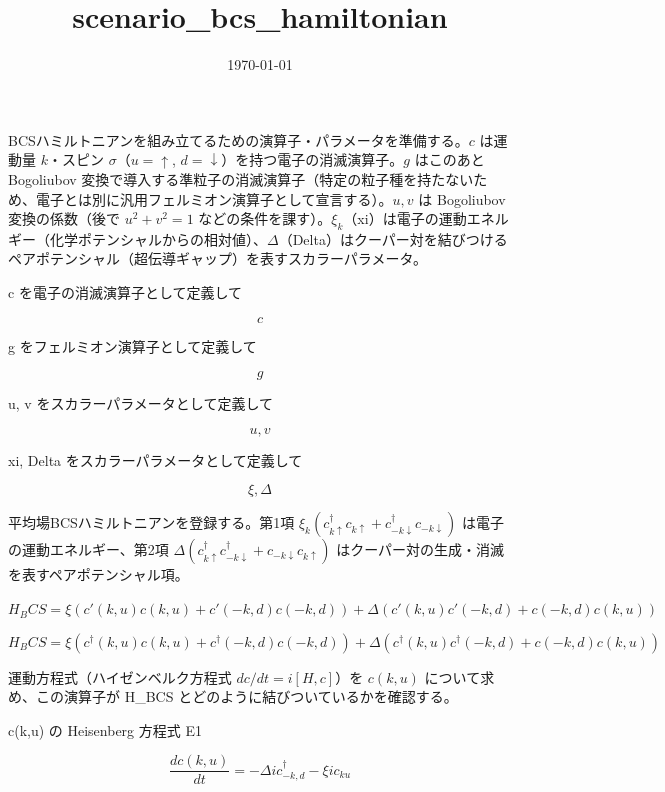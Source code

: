 \documentclass[dvipdfmx,a4paper,11pt]{jsarticle}
\title{scenario\_bcs\_hamiltonian}
\date{\today}
\begin{document}
\maketitle

BCSハミルトニアンを組み立てるための演算子・パラメータを準備する。$c$ は運動量 $k$・スピン $\sigma$（$u=\uparrow$, $d=\downarrow$）を持つ電子の消滅演算子。$g$ はこのあと Bogoliubov 変換で導入する準粒子の消滅演算子（特定の粒子種を持たないため、電子とは別に汎用フェルミオン演算子として宣言する）。$u, v$ は Bogoliubov 変換の係数（後で $u^2+v^2=1$ などの条件を課す）。$\xi_k$（xi）は電子の運動エネルギー（化学ポテンシャルからの相対値）、$\Delta$（Delta）はクーパー対を結びつけるペアポテンシャル（超伝導ギャップ）を表すスカラーパラメータ。

c を電子の消滅演算子として定義して

\[
  c
\]

g をフェルミオン演算子として定義して

\[
  g
\]

u, v をスカラーパラメータとして定義して

\[
  u, v
\]

xi, Delta をスカラーパラメータとして定義して

\[
  \xi, \Delta
\]

平均場BCSハミルトニアンを登録する。第1項 $\xi_k(c^\dagger_{k\uparrow}c_{k\uparrow}+c^\dagger_{-k\downarrow}c_{-k\downarrow})$ は電子の運動エネルギー、第2項 $\Delta(c^\dagger_{k\uparrow}c^\dagger_{-k\downarrow}+c_{-k\downarrow}c_{k\uparrow})$ はクーパー対の生成・消滅を表すペアポテンシャル項。

$H_BCS = \xi (c'(k,u) c(k,u) + c'(-k,d) c(-k,d)) + \Delta (c'(k,u) c'(-k,d) + c(-k,d) c(k,u))$

\begin{equation}
  H_BCS = \xi (c^{\dagger}(k,u) c(k,u) + c^{\dagger}(-k,d) c(-k,d)) + \Delta (c^{\dagger}(k,u) c^{\dagger}(-k,d) + c(-k,d) c(k,u))
  \label{eq:E1}
\end{equation}

運動方程式（ハイゼンベルク方程式 $dc/dt=i[H,c]$）を $c(k,u)$ について求め、この演算子が H\_BCS とどのように結びついているかを確認する。

c(k,u) の Heisenberg 方程式 E1

\begin{equation}
  \frac{d c(k,u)}{d t} = - \Delta \mathit{i} {c}_{-k,d}^{\dagger} - \xi \mathit{i} {c}_{ku}
  \label{eq:E2}
\end{equation}
\end{document}
